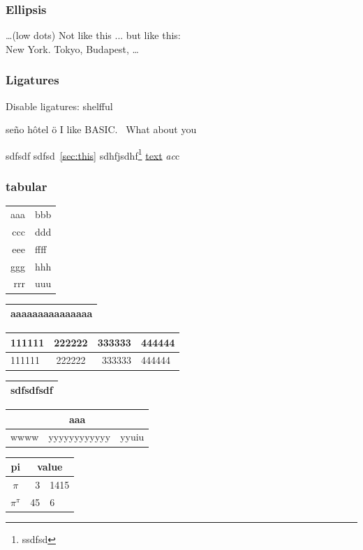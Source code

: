\documentclass[11pt]{article}
\begin{document}
\subsubsection{Ellipsis}
\ldots(low dots)
Not like this ... but like this:\\
New York. Tokyo, Budapest, \ldots

\subsubsection{Ligatures}
Disable ligatures: shelf\mbox{}ful

se\~no h\^otel \"o
I like BASIC\@.~ What about you

sdfsdf\label{sec:this} sdfsd~\ref{sec:this}
sdhfjsdhf\footnote{ssdfsd} \underline{text}
\emph{a\emph{c}}c
\verb@\ldots@
\subsubsection{tabular}
\begin{tabular}{|r|l|}
	\hline
	aaa&bbb\\
	ccc&ddd\\
	eee&ffff\\ \cline{2-2}
	ggg&hhh\\ \hline
	\hline
	rrr&uuu\\
	\hline
\end{tabular}
\begin{tabular}{|p{4.7cm}|}
	\hline
	aaaaaaaaaaaaaaa\\
	\hline
\end{tabular}

\begin{tabular}[c]{|p{10cm}|c|r|l|}
	\hline
	111111&222222&333333&444444\\
	\hline
	111111&222222&333333&444444\\
	\hline
\end{tabular}

\begin{tabular}{@{dddd} c @{fffff}}
	\hline
	sdfsdfsdf\\
	\hline
\end{tabular}

\begin{tabular}{|c|c|c|}
	\hline
	\multicolumn{3}{|c|}{aaa}\\
	\hline
	wwww&yyyyyyyyyyyy&yyuiu\\
	\hline
\end{tabular}
\begin{tabular}{c r @{.} l}
	pi &\multicolumn{2}{c}{value}\\
	\hline
	$\pi$ & 3&1415\\
	$\pi^{\pi}$ &  45&6\\
\end{tabular}
\end{document}
